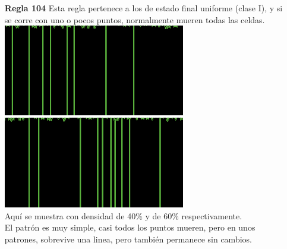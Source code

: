 \documentclass{article}
\begin{document}
\begin{enumerate}
\item[\bf{Regla 104}] Esta regla pertenece a los de estado final uniforme (clase I), y si se corre con uno o pocos puntos, normalmente mueren todas las celdas.\\

\includegraphics[width=300px]{104-40.png}\\
\includegraphics[width=300px]{104-60.png}\\

Aquí se muestra con densidad de 40\% y de 60\% respectivamente.\\
El patrón es muy simple, casi todos los puntos mueren, pero en unos patrones, sobrevive una linea, pero también permanece sin cambios.



\end{enumerate}
\end{document}
